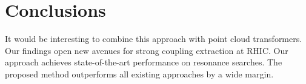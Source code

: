 \section{Conclusions}\label{sec:conclusions}

It would be interesting to combine this approach with point cloud
transformers. Our findings open new avenues for strong coupling
extraction at RHIC. Our approach achieves state-of-the-art performance
on resonance searches. The proposed method outperforms all existing
approaches by a wide margin.

